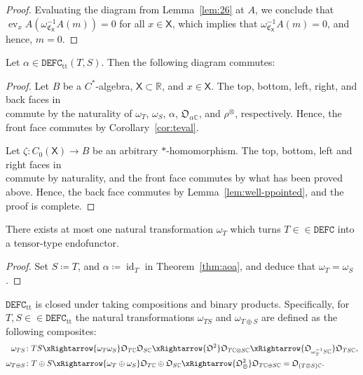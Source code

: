 \documentclass[10pt]{simplearticle}
\newcommand{\tikzinput}[1]{}
\newcommand{\ev}{\operatorname{ev}}
\newcommand{\id}{\operatorname{id}}
\newcommand{\DEFC}{\mathbb{\mathtt{DEFC}}}
\newcommand{\C}{\mathfrak{C}^{\,}}
\newcommand{\ttt}{\operatorname{tt}}
\begin{document}
\begin{proof}
Evaluating the diagram from Lemma~\ref{lem:26}
at $A$, we conclude that $\ev_{x}A\left(\omega^{-1}_{\C_{\mathsf{X}}}A(m)\right)=0$
 for all $x\in\mathsf{X}$, which implies that $\omega^{-1}_{\C_{\mathsf{X}}}A(m)=0$,
and hence, $m=0$.
\end{proof}

\begin{thm}\label{thm:aoa}
Let $\alpha\in\DEFC_{\ttt}(T,S)$. Then the following
diagram commutes:
\[
\tikzinput{d379}
\]

\end{thm}

\begin{proof}
Let $B$ be a $C^{*}$-algebra, $\mathsf{X}\subset\mathbb{R}$, and
$x\in\mathsf{X}$. The top, bottom, left, right, and back faces in
\[
\tikzinput{d380}
\]
commute by the naturality of $\omega_{T}$, $\omega_{S}$, $\alpha$,
$\mathfrak{O}_{\alpha\mathbb{C}}$, and $\rho^{\otimes}$, respectively.
Hence, the front face commutes by Corollary~\ref{cor:teval}.

Let $\zeta\colon C_{0}(\mathsf{X})\to B$ be an arbitrary $*$-homomorphism.
The top, bottom, left and right faces in
\[
\tikzinput{d381}
\]
commute by naturality, and the front face commutes by what has been
proved above. Hence, the back face commutes by Lemma~\ref{lem:well-ppointed},
and the proof is complete.
\end{proof}

\begin{cor}
There exists at most one natural transformation $\omega_{T}$ which
turns $T\in\in\DEFC$ into a tensor-type endofunctor.
\end{cor}

\begin{proof}
Set $S\coloneqq T$, and $\alpha\coloneqq\id_{T}$ in Theorem~\ref{thm:aoa},
and deduce that $\omega_{T}=\omega_{S}$.
\end{proof}

\begin{lem}\label{lem:def-omegaF}
 $\DEFC_{\ttt}$ is closed under taking compositions
and binary products. Specifically, for $T,S\in\in\DEFC_{\ttt}$ the
natural transformations $\omega_{TS}$ and $\omega_{T\oplus S}$ are
defined as the following composites:
\begin{alignat}{1}
\omega_{TS}\colon & TS\xRightarrow{\omega_{T}\omega_{S}}\mathfrak{O}_{T\mathbb{C}}\mathfrak{O}_{S\mathbb{C}}\xRightarrow{\mathfrak{O}^{2}}\mathfrak{O}_{T\mathbb{C}\otimes S\mathbb{C}}\xRightarrow{\mathfrak{O}_{\omega^{-1}_{T}S\mathbb{C}}}\mathfrak{O}_{TS\mathbb{C}},\label{eq:omega1}\\
\omega_{T\oplus S}\colon & T\oplus S\xRightarrow{\omega_{T}\oplus\omega_{S}}\mathfrak{O}_{T\mathbb{C}}\oplus\mathfrak{O}_{S\mathbb{C}}\xRightarrow{\mathfrak{O}^{2}_{\oplus}}\mathfrak{O}_{T\mathbb{C}\oplus S\mathbb{C}}=\mathfrak{O}_{(T\oplus S)\mathbb{C}}.\label{eq:omega2}
\end{alignat}
\end{lem}
\end{document}
